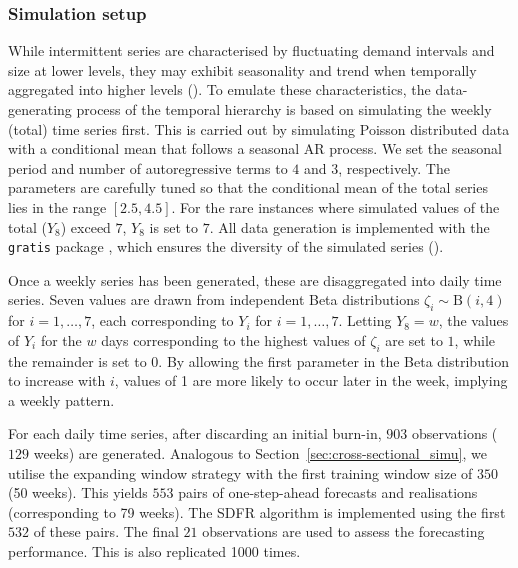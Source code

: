 \documentclass[a4paper,review,11pt,authoryear]{elsarticle}
\let\code=\texttt
\theoremstyle{definition}
\begin{document}
     \subsubsection{Simulation setup}

     While intermittent series are characterised by fluctuating demand intervals and size at lower levels, they may exhibit seasonality and trend when temporally aggregated into higher levels ().
     To emulate these characteristics, the data-generating process of the temporal hierarchy is based on simulating the weekly (total) time series first. This is carried out by simulating Poisson distributed data with a conditional mean that follows a seasonal AR process. We set the seasonal period and number of autoregressive terms to $4$ and $3$, respectively. The parameters are carefully tuned so that the conditional mean of the total series lies in the range $[2.5, 4.5]$. For the rare instances where simulated values of the total ($Y_8$) exceed $7$, $Y_8$ is set to $7$. All data generation is implemented with the \code{gratis} package \citep{gratis}, which ensures the diversity of the simulated series ().
     
     Once a weekly series has been generated, these are disaggregated into daily time series. 
     Seven values are drawn from independent Beta distributions $\zeta_i\sim\textrm{B}(i, 4)$ for $i=1,\dots,7$, each corresponding to $Y_i$ for $i=1,\dots,7$.
     Letting $Y_8=w$, the values of $Y_i$ for the $w$ days corresponding to the highest values of $\zeta_i$ are set to $1$, while the remainder is set to $0$. By allowing the first parameter in the Beta distribution to increase with $i$, values of 1 are more likely to occur later in the week, implying a weekly pattern.

     For each daily time series, after discarding an initial burn-in, $903$ observations ($129$ weeks) are generated. Analogous to Section~\ref{sec:cross-sectional_simu}, we utilise the expanding window strategy with the first training window size of $350$ (50 weeks). This yields $553$ pairs of one-step-ahead forecasts and realisations (corresponding to 79 weeks). The SDFR algorithm is implemented using the first $532$ of these pairs. The final $21$ observations are used to assess the forecasting performance. This is also replicated 1000 times.
\end{document}
